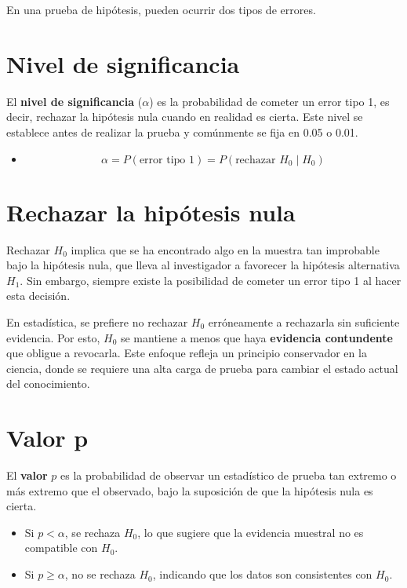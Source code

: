 \documentclass[
  letterpaper,
  DIV=11,
  numbers=noendperiod]{scrreprt}
\providecommand{\tightlist}{%
  \setlength{\itemsep}{0pt}\setlength{\parskip}{0pt}}\usepackage{longtable,booktabs,array}
\begin{document}
En una prueba de hipótesis, pueden ocurrir dos tipos de errores.

\section{Nivel de significancia}\label{nivel-de-significancia-1}

El \textbf{nivel de significancia} (\(\alpha\)) es la probabilidad de
cometer un error tipo 1, es decir, rechazar la hipótesis nula cuando en
realidad es cierta. Este nivel se establece antes de realizar la prueba
y comúnmente se fija en 0.05 o 0.01.

\begin{itemize}
\tightlist
\item
  \[\alpha = P(\text{error tipo 1}) = P(\text{rechazar $H_0$}\mid H_0)\]
\end{itemize}

\section{Rechazar la hipótesis
nula}\label{rechazar-la-hipuxf3tesis-nula}

Rechazar \(H_0\) implica que se ha encontrado algo en la muestra tan
improbable bajo la hipótesis nula, que lleva al investigador a favorecer
la hipótesis alternativa \(H_1\). Sin embargo, siempre existe la
posibilidad de cometer un error tipo 1 al hacer esta decisión.

En estadística, se prefiere no rechazar \(H_0\) erróneamente a
rechazarla sin suficiente evidencia. Por esto, \(H_0\) se mantiene a
menos que haya \textbf{evidencia contundente} que obligue a revocarla.
Este enfoque refleja un principio conservador en la ciencia, donde se
requiere una alta carga de prueba para cambiar el estado actual del
conocimiento.

\section{Valor p}\label{valor-p}

El \textbf{valor} \(p\) es la probabilidad de observar un estadístico de
prueba tan extremo o más extremo que el observado, bajo la suposición de
que la hipótesis nula es cierta.

\begin{itemize}
\tightlist
\item
  Si \(p < \alpha\), se rechaza \(H_0\), lo que sugiere que la evidencia
  muestral no es compatible con \(H_0\).
\item
  Si \(p \geq \alpha\), no se rechaza \(H_0\), indicando que los datos
  son consistentes con \(H_0\).
\end{itemize}
\end{document}

